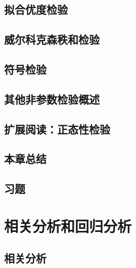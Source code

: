 \documentclass[UTF8,12pt,a4paper,fontset=fandol]{ctexbook}
\begin{document}
\section{拟合优度检验}
\label{sec:study-goodness-of-fit}

\section{威尔科克森秩和检验}
\label{sec:study-wilcoxon}

\section{符号检验}
\label{sec:study-sign-test}

\section{其他非参数检验概述}
\label{sec:study-other-nonparametric}

\section{扩展阅读：正态性检验}
\label{sec:study-normality-tests}

\section*{本章总结}

\section*{习题}

\chapter{相关分析和回归分析}
\label{chap:study-correlation-regression}

\section{相关分析}
\label{sec:study-correlation}
\end{document}
